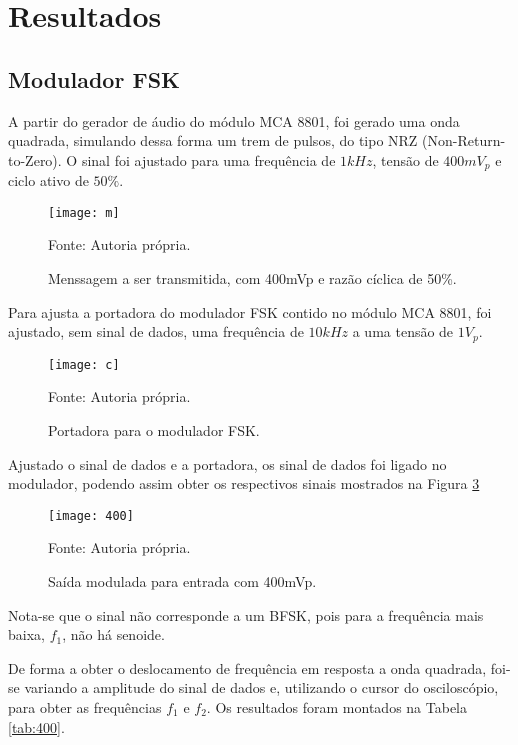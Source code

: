 \newpage
\section{Resultados}

\subsection{Modulador FSK}

A partir do gerador de áudio do módulo MCA 8801, foi gerado uma onda quadrada, simulando dessa forma um trem de pulsos, do tipo NRZ (Non-Return-to-Zero). O sinal foi ajustado para uma frequência de $1 kHz$, tensão de $400 mV_p$ e ciclo ativo de $50 \%$.

\begin{figure}[H]
    \centering
    \caption{Menssagem a ser transmitida, com 400mVp e razão cíclica de 50\%.}
    \texttt{[image: m]}
    \label{fig:m}
    
    \small Fonte: Autoria própria.
\end{figure}

Para ajusta a portadora do modulador FSK contido no módulo MCA 8801, foi ajustado, sem sinal de dados, uma frequência de $10 kHz$ a uma tensão de $1 V_p$. 

\begin{figure}[H]
    \centering
    \caption{Portadora para o modulador FSK.}
    \texttt{[image: c]}
    \label{fig:c}
    
    \small Fonte: Autoria própria.
\end{figure}

Ajustado o sinal de dados e a portadora, os sinal de dados foi ligado no modulador, podendo assim obter os respectivos sinais mostrados na Figura \ref{fig:400}


\begin{figure}[H]
    \centering
    \caption{Saída modulada para entrada com 400mVp.}
    \texttt{[image: 400]}
    \label{fig:400}
    
    \small Fonte:  Autoria própria.
\end{figure}

Nota-se que o sinal não corresponde a um BFSK, pois para a frequência mais baixa, $f_1$, não há senoide.

De forma a obter o deslocamento de frequência em resposta a onda quadrada, foi-se variando a amplitude do sinal de dados e, utilizando o cursor do osciloscópio, para obter as frequências $f_1$ e $f_2$. Os resultados foram montados na Tabela \ref{tab:400}.


